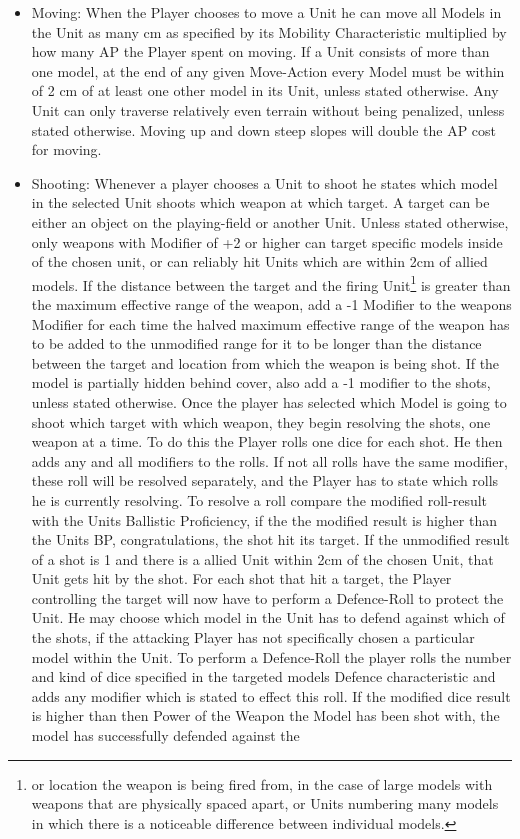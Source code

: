 \documentclass[a4paper,12pt]{book}
\begin{document}
\begin{adjustwidth}{-2cm}{-2cm}
\begin{multicols}{2}
\begin{itemize}

	\item Moving: When the Player chooses to move a Unit he can move all Models in the Unit as many cm as specified by its Mobility Characteristic multiplied by how many AP the Player spent on moving. If a Unit consists of more than one model, at the end of any given Move-Action every Model must be within of 2 cm of at least one other model in its Unit, unless stated otherwise. Any Unit can only traverse relatively even terrain without being penalized, unless stated otherwise. Moving up and down steep slopes will double the AP cost for moving.
	\item Shooting: Whenever a player chooses a Unit to shoot he states which model in the selected Unit shoots which weapon at which target. A target can be either an object on the playing-field or another Unit. Unless stated otherwise, only weapons with Modifier of +2 or higher can target specific models inside of the chosen unit, or can reliably hit Units which are within 2cm of allied models. If the distance between the target and the firing Unit\footnote{or location the weapon is being fired from, in the case of large models with weapons that are physically spaced apart, or Units numbering many models in which there is a noticeable difference between individual models.} is greater than the maximum effective range of the weapon, add a -1 Modifier to the weapons Modifier for each time the halved maximum effective range of the weapon has to be added to the unmodified range for it to be longer than the distance between the target and location from which the weapon is being shot. If the model is partially hidden behind cover, also add a -1 modifier to the shots, unless stated otherwise. Once the player has selected which Model is going to shoot which target with which weapon, they begin resolving the shots, one weapon at a time. To do this the Player rolls one dice for each shot. He then adds any and all modifiers to the rolls. If not all rolls have the same modifier, these roll will be resolved separately, and the Player has to state which rolls he is currently resolving. To resolve a roll compare the modified roll-result with the Units Ballistic Proficiency, if the the modified result is higher than the Units BP, congratulations, the shot hit its target. If the unmodified result of a shot is 1 and there is a allied Unit within 2cm of the chosen Unit, that Unit gets hit by the shot. For each shot that hit a target, the Player controlling the target will now have to perform a Defence-Roll to protect the Unit. He may choose which model in the Unit has to defend against which of the shots, if the attacking Player has not specifically chosen a particular model within the Unit. To perform a Defence-Roll the player rolls the number and kind of dice specified in the targeted models Defence characteristic and adds any modifier which is stated to effect this roll. If the modified dice result is higher than then Power of the Weapon the Model has been shot with, the model has successfully defended against the  
\end{itemize}
\end{multicols}
\end{adjustwidth}
\end{document}
